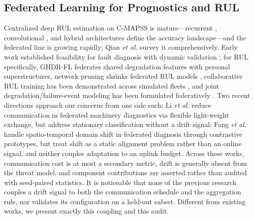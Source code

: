 \documentclass[journal]{IEEEtran}
\begin{document}
\subsection{Federated Learning for Prognostics and RUL}
Centralized deep RUL estimation on C-MAPSS is mature---recurrent \cite{heimes2008,zheng2017}, convolutional \cite{li2018}, and hybrid \cite{asif2022} architectures define the accuracy landscape---and the federated line is growing rapidly; Qian \emph{et al.} \cite{qian2025ftl} survey it comprehensively. Early work established feasibility for fault diagnosis with dynamic validation \cite{zhang2021kbs}; for RUL specifically, GHDR-FL \cite{chen2023ghdr} federates shared degradation features with personal superstructures, network pruning shrinks federated RUL models \cite{chen2023pruning}, collaborative RUL training has been demonstrated across simulated fleets \cite{vermelin2024}, and joint degradation/failure-event modeling has been formulated federatively \cite{jeong2025fedjoint}. Two recent directions approach our concerns from one side each: Li \emph{et al.} \cite{li2026light} reduce communication in federated machinery diagnostics via flexible light-weight exchange, but address stationary classification without a drift signal; Fang \emph{et al.} \cite{fang2025proto} handle spatio-temporal domain shift in federated diagnosis through contrastive prototypes, but treat shift as a static alignment problem rather than an online signal, and neither couples adaptation to an uplink budget. Across these works, communication cost is at most a secondary metric, drift is generally absent from the threat model, and component contributions are asserted rather than audited with seed-paired statistics. It is noticeable that none of the previous research couples a drift signal to both the communication schedule and the aggregation rule, nor validates its configuration on a held-out subset. Different from existing works, we present exactly this coupling and this audit.
\end{document}
